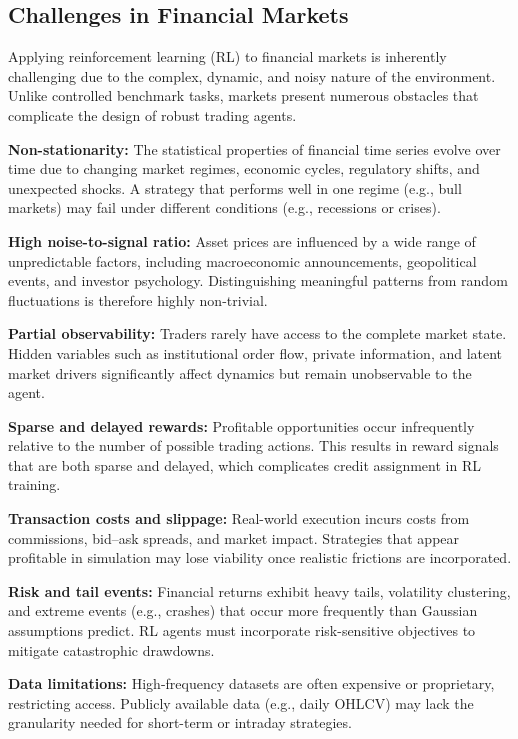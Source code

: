 \documentclass[12pt,a4paper]{report}
\begin{document}
\subsection{Challenges in Financial Markets}

Applying reinforcement learning (RL) to financial markets is inherently challenging due to the complex, dynamic, and noisy nature of the environment. Unlike controlled benchmark tasks, markets present numerous obstacles that complicate the design of robust trading agents.

\bigskip
\textbf{Non-stationarity:}  
The statistical properties of financial time series evolve over time due to changing market regimes, economic cycles, regulatory shifts, and unexpected shocks. A strategy that performs well in one regime (e.g., bull markets) may fail under different conditions (e.g., recessions or crises).

\bigskip
\textbf{High noise-to-signal ratio:}  
Asset prices are influenced by a wide range of unpredictable factors, including macroeconomic announcements, geopolitical events, and investor psychology. Distinguishing meaningful patterns from random fluctuations is therefore highly non-trivial.

\bigskip
\textbf{Partial observability:}  
Traders rarely have access to the complete market state. Hidden variables such as institutional order flow, private information, and latent market drivers significantly affect dynamics but remain unobservable to the agent.

\bigskip
\textbf{Sparse and delayed rewards:}  
Profitable opportunities occur infrequently relative to the number of possible trading actions. This results in reward signals that are both sparse and delayed, which complicates credit assignment in RL training.

\bigskip
\textbf{Transaction costs and slippage:}  
Real-world execution incurs costs from commissions, bid–ask spreads, and market impact. Strategies that appear profitable in simulation may lose viability once realistic frictions are incorporated.

\bigskip
\textbf{Risk and tail events:}  
Financial returns exhibit heavy tails, volatility clustering, and extreme events (e.g., crashes) that occur more frequently than Gaussian assumptions predict. RL agents must incorporate risk-sensitive objectives to mitigate catastrophic drawdowns.

\bigskip
\textbf{Data limitations:}  
High-frequency datasets are often expensive or proprietary, restricting access. Publicly available data (e.g., daily OHLCV) may lack the granularity needed for short-term or intraday strategies.
\end{document}
